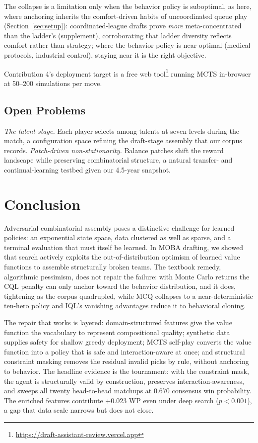 \documentclass[journal]{IEEEtran}
\newcommand{\deployurl}{\url{https://draft-assistant-review.vercel.app}}
\newcommand{\deployurl}{\url{https://www.hotsfever.com}}
\begin{document}
The collapse is a limitation only when the behavior policy is suboptimal, as here, where anchoring inherits the comfort-driven habits of uncoordinated queue play (Section~\ref{sec:setup}): coordinated-league drafts prove \textit{more} meta-concentrated than the ladder's (supplement), corroborating that ladder diversity reflects comfort rather than strategy; where the behavior policy is near-optimal (medical protocols, industrial control), staying near it is the right objective.

Contribution 4's deployment target is a free web tool\footnote{\deployurl} running MCTS in-browser at 50--200 simulations per move.

\subsection{Open Problems}
\label{sec:open}

\textit{The talent stage.} Each player selects among talents at seven levels during the match, a configuration space refining the draft-stage assembly that our corpus records. \textit{Patch-driven non-stationarity.} Balance patches shift the reward landscape while preserving combinatorial structure, a natural transfer- and continual-learning testbed given our 4.5-year snapshot.
\section{Conclusion}

Adversarial combinatorial assembly poses a distinctive challenge for learned policies: an exponential state space, data clustered as well as sparse, and a terminal evaluation that must itself be learned. In MOBA drafting, we showed that search actively exploits the out-of-distribution optimism of learned value functions to assemble structurally broken teams. The textbook remedy, algorithmic pessimism, does not repair the failure: with Monte Carlo returns the CQL penalty can only anchor toward the behavior distribution, and it does, tightening as the corpus quadrupled, while MCQ collapses to a near-deterministic ten-hero policy and IQL's vanishing advantages reduce it to behavioral cloning.

The repair that works is layered: domain-structured features give the value function the vocabulary to represent compositional quality; synthetic data supplies safety for shallow greedy deployment; MCTS self-play converts the value function into a policy that is safe and interaction-aware at once; and structural constraint masking removes the residual invalid picks by rule, without anchoring to behavior. The headline evidence is the tournament: with the constraint mask, the agent is structurally valid by construction, preserves interaction-awareness, and sweeps all twenty head-to-head matchups at 0.670 consensus win probability. The enriched features contribute +0.023 WP even under deep search ($p < 0.001$), a gap that data scale narrows but does not close.
\end{document}

